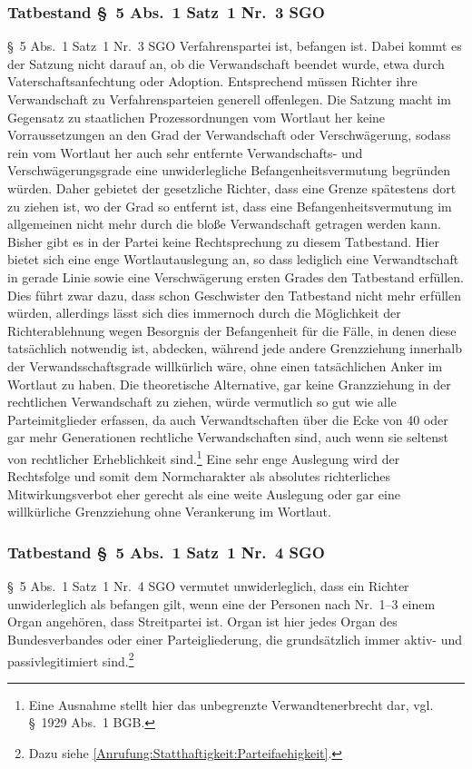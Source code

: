 \subsubsection{Tatbestand \S~5 Abs.~1 Satz~1 Nr.~3 SGO}
\label{Zusammensetzung:Spruchkoerper:Befangenheitsvermutung:Nr3}
\S~5 Abs.~1 Satz~1 Nr.~3 SGO Verfahrenspartei ist, befangen ist.
Dabei kommt es der Satzung nicht darauf an, ob die Verwandschaft beendet wurde, etwa durch Vaterschaftsanfechtung oder Adoption.
Entsprechend müssen Richter ihre Verwandschaft zu Verfahrensparteien generell offenlegen.
Die Satzung macht im Gegensatz zu staatlichen Prozessordnungen vom Wortlaut her keine Vorraussetzungen an den Grad der Verwandschaft oder Verschwägerung, sodass rein vom Wortlaut her auch sehr entfernte Verwandschafts- und Verschwägerungsgrade eine unwiderlegliche Befangenheitsvermutung begründen würden.
Daher gebietet der gesetzliche Richter, dass eine Grenze spätestens dort zu ziehen ist, wo der Grad so entfernt ist, dass eine Befangenheitsvermutung im allgemeinen nicht mehr durch die bloße Verwandschaft getragen werden kann.
Bisher gibt es in der Partei keine Rechtsprechung zu diesem Tatbestand.
Hier bietet sich eine enge Wortlautauslegung an, so dass lediglich eine Verwandtschaft in gerade Linie sowie eine Verschwägerung ersten Grades den Tatbestand erfüllen.
Dies führt zwar dazu, dass schon Geschwister den Tatbestand nicht mehr erfüllen würden, allerdings lässt sich dies immernoch durch die Möglichkeit der Richterablehnung wegen Besorgnis der Befangenheit für die Fälle, in denen diese tatsächlich notwendig ist, abdecken, während jede andere Grenzziehung innerhalb der Verwandsschaftsgrade willkürlich wäre, ohne einen tatsächlichen Anker im Wortlaut zu haben.
Die theoretische Alternative, gar keine Granzziehung in der rechtlichen Verwandschaft zu ziehen, würde vermutlich so gut wie alle Parteimitglieder erfassen, da auch Verwandtschaften über die Ecke von 40 oder gar mehr Generationen rechtliche Verwandschaften sind, auch wenn sie seltenst von rechtlicher Erheblichkeit sind.\footnote{Eine Ausnahme stellt hier das unbegrenzte Verwandtenerbrecht dar, vgl. \S~1929 Abs.~1 BGB.}
Eine sehr enge Auslegung wird der Rechtsfolge und somit dem Normcharakter als absolutes richterliches Mitwirkungsverbot eher gerecht als eine weite Auslegung oder gar eine willkürliche Grenzziehung ohne Verankerung im Wortlaut.

\subsubsection{Tatbestand \S~5 Abs.~1 Satz~1 Nr.~4 SGO}
\label{Zusammensetzung:Spruchkoerper:Befangenheitsvermutung:Nr4}
\S~5 Abs.~1 Satz~1 Nr.~4 SGO vermutet unwiderleglich, dass ein Richter unwiderleglich als befangen gilt, wenn eine der Personen nach Nr.~1--3 einem Organ angehören, dass Streitpartei ist.
Organ ist hier jedes Organ des Bundesverbandes oder einer Parteigliederung, die grundsätzlich immer aktiv- und passivlegitimiert sind.\footnote{Dazu siehe \ref{Anrufung:Statthaftigkeit:Parteifaehigkeit}.}

